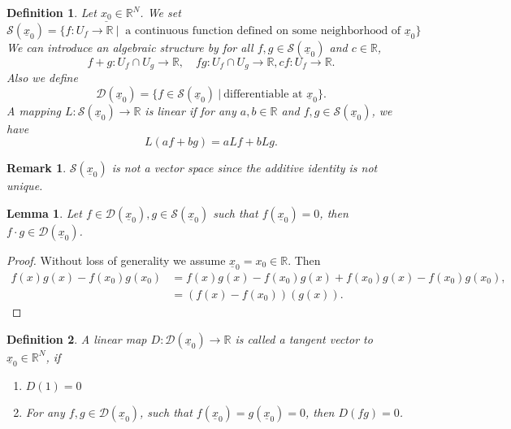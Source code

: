 \documentclass{article}
\newtheorem{definition}{Definition}[section]
\newtheorem{lemma}{Lemma}[section]
\newtheorem{remark}{Remark}[section]
\newcommand{\R}[0]{\mathbb{R}}
\newcommand{\sep}[0]{\:|\:}
\begin{document}
\begin{definition}
  Let $\underline{x_0}\in\R^N$. We set 
  \begin{equation*}
    \mathcal{S}(\underline{x}_0) = \{f:U_f\to\R\sep \text{ a continuous function defined on some neighborhood of $\underline{x}_0$}\}
  \end{equation*}
  We can introduce an algebraic structure by for all $f,g\in \mathcal{S}(\underline{x}_0)$ and $c\in\R$,
  \begin{equation*}
    f+g:U_f\cap U_g\to\R,\quad fg:U_f\cap U_g\to\R, cf:U_f\to\R.
  \end{equation*}
  Also we define 
  \begin{equation*}
    \mathcal{D}(\underline{x}_0) = \{f\in\mathcal{S}(\underline{x}_0)\sep \text{differentiable at $\underline{x}_0$}\}.
  \end{equation*}
  A mapping $L:\mathcal{S}(\underline{x}_0)\to\R$ is linear if for any $a,b\in\R$ and $f,g\in\mathcal{S}(\underline{x}_0)$, we have 
  \begin{equation*}
    L(af+bg) = aLf+bLg.
  \end{equation*}
\end{definition}

\begin{remark}
  $\mathcal{S}(\underline{x}_0)$ is not a vector space since the additive identity is not unique.
\end{remark}

\begin{lemma}
  Let $f\in\mathcal{D}(\underline{x}_0),g\in\mathcal{S}(\underline{x}_0)$ such that $f(\underline{x}_0) = 0$, then $f\cdot g\in\mathcal{D}(\underline{x}_0)$. 
\end{lemma}

\begin{proof}
  Without loss of generality we assume $\underline{x}_0 = x_0 \in\R$. Then 
  \begin{align*}
    f(x)g(x) - f(x_0)g(x_0) & = f(x)g(x) - f(x_0)g(x)+f(x_0)g(x) - f(x_0)g(x_0),\\
    &= (f(x)-f(x_0))(g(x)).
  \end{align*}
\end{proof}

\begin{definition}
  A linear map $D:\mathcal{D}(\underline{x}_0)\to\R$ is called a tangent vector to $\underline{x}_0\in\R^N$, if 
  \begin{enumerate}[1).]
    \item $D(1) = 0$
    \item For any $f,g\in\mathcal{D}(\underline{x}_0)$, such that $f(\underline{x}_0) = g(\underline{x}_0)=0$, then $D(fg) = 0$. 
  \end{enumerate}
\end{definition}
\end{document}

